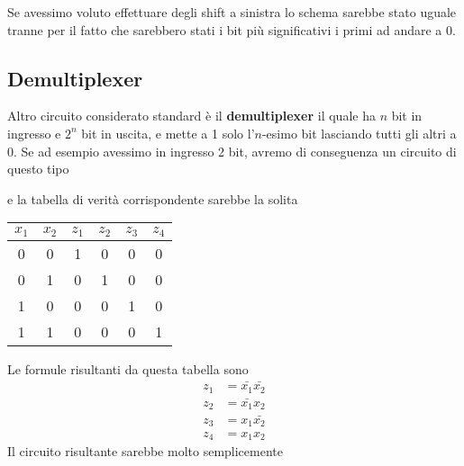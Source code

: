 Se avessimo voluto effettuare degli shift a sinistra lo schema sarebbe stato uguale tranne per il
fatto che sarebbero stati i bit più significativi i primi ad andare a 0.

\subsection{Demultiplexer}
Altro circuito considerato standard è il \textbf{demultiplexer} il quale ha $n$ bit in ingresso e
$2^n$ bit in uscita, e mette a 1 solo l'$n$-esimo bit lasciando tutti gli altri a 0. Se ad esempio
avessimo in ingresso 2 bit, avremo di conseguenza un circuito di questo tipo
\begin{center}
\end{center}
e la tabella di verità corrispondente sarebbe la solita
\begin{center}
	\begin{tabular}{c c | c c c c}
		$x_1$ & $x_2$ & $z_1$ & $z_2$ & $z_3$ & $z_4$ \\ \hline
		0     & 0     & 1     & 0     & 0     & 0     \\
		0     & 1     & 0     & 1     & 0     & 0     \\
		1     & 0     & 0     & 0     & 1     & 0     \\
		1     & 1     & 0     & 0     & 0     & 1
	\end{tabular}
\end{center}
Le formule risultanti da questa tabella sono
\begin{align*}
	z_1 & = \bar{x_1} \bar{x_2} \\
	z_2 & = \bar{x_1} x_2       \\
	z_3 & = x_1 \bar{x_2}       \\
	z_4 & = x_1 x_2
\end{align*}
Il circuito risultante sarebbe molto semplicemente
